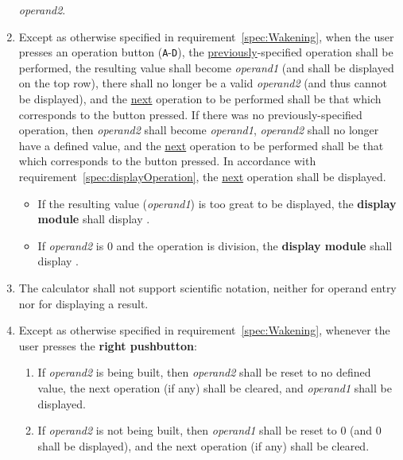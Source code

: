 \begin{enumerate}
    \textit{operand2}.
\item Except as otherwise specified in requirement~\ref{spec:Wakening}, when
    the user presses an operation button (\texttt{A}-\texttt{D}), the
    \underline{previously}-specified operation shall be performed, the
    resulting value shall become \textit{operand1} (and shall be displayed on the top row),
    there shall no longer be a valid \textit{operand2} (and thus cannot be displayed), and the \underline{next} operation
    to be performed shall be that which corresponds to the button pressed. If
    there was no previously-specified operation, then \textit{operand2} shall
    become \textit{operand1}, \textit{operand2} shall no longer have a defined
    value, and the \underline{next} operation to be performed shall be that
    which corresponds to the button pressed. In accordance with requirement~\ref{spec:displayOperation}, the \underline{next} operation shall be displayed.
    \begin{itemize}
    \item If the resulting value (\textit{operand1}) is too great to be
        displayed, the \textbf{display module} shall display
        .
    \item If \textit{operand2} is 0 and the operation is division, the
        \textbf{display module} shall display .
    \end{itemize}
\item The calculator shall not support scientific notation, neither for operand
    entry nor for displaying a result.
\item Except as otherwise specified in requirement~\ref{spec:Wakening},
    whenever the user presses the \textbf{right pushbutton}:
    \begin{enumerate}
    \item If \textit{operand2} is being built, then \textit{operand2} shall be
        reset to no defined value, the next operation (if any) shall be
        cleared, and \textit{operand1} shall be displayed.
    \item If \textit{operand2} is not being built, then \textit{operand1} shall
        be reset to 0 (and 0 shall be displayed), and the next operation (if
        any) shall be cleared.
    \end{enumerate}


\end{enumerate}
